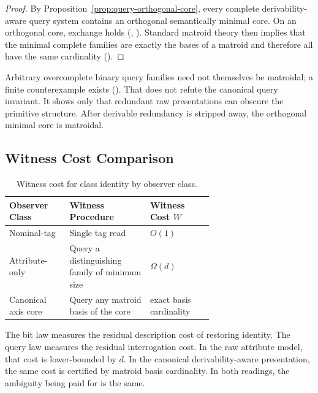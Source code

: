 \begin{proof}
By Proposition~\ref{prop:query-orthogonal-core}, every complete derivability-aware query system contains an orthogonal semantically minimal core. On an orthogonal core, exchange holds (, ). Standard matroid theory then implies that the minimal complete families are exactly the bases of a matroid and therefore all have the same cardinality ().
\end{proof}

\begin{remark}
Arbitrary overcomplete binary query families need not themselves be matroidal; a finite counterexample exists (). That does not refute the canonical query invariant. It shows only that redundant raw presentations can obscure the primitive structure. After derivable redundancy is stripped away, the orthogonal minimal core is matroidal.
\end{remark}

\subsection{Witness Cost Comparison}

\begin{table}[h]
\centering
\small
\begin{tabular}{|>{\raggedright\arraybackslash}p{0.18\linewidth}|>{\raggedright\arraybackslash}p{0.28\linewidth}|>{\raggedright\arraybackslash}p{0.20\linewidth}|}
\hline
\textbf{Observer Class} & \textbf{Witness Procedure} & \textbf{Witness Cost $W$} \\
\hline
Nominal-tag & Single tag read & $O(1)$ \\
Attribute-only & Query a distinguishing family of minimum size & $\Omega(d)$ \\
Canonical axis core & Query any matroid basis of the core & exact basis cardinality \\
\hline
\end{tabular}
\vspace{3pt}
\caption{Witness cost for class identity by observer class.}
\label{tab:witness-comparison}
\end{table}

\begin{remark}
The bit law measures the residual description cost of restoring identity. The query law measures the residual interrogation cost. In the raw attribute model, that cost is lower-bounded by $d$. In the canonical derivability-aware presentation, the same cost is certified by matroid basis cardinality. In both readings, the ambiguity being paid for is the same.
\end{remark}
